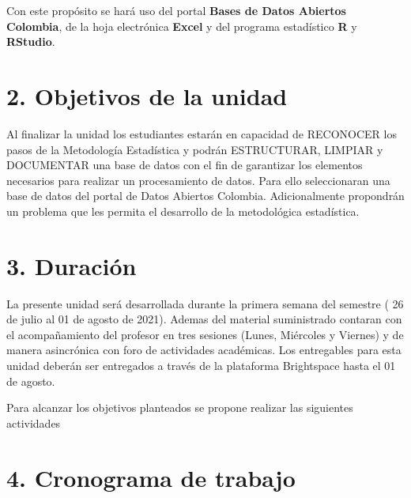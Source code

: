 \documentclass[base=hide,11pt]{elegantbook}
\begin{document}
Con este propósito se hará uso del portal \textbf{Bases de Datos Abiertos Colombia},  de la hoja electrónica \textbf{Excel} y del programa estadístico \textbf{R} y \textbf{RStudio}.\\

\section*{2. Objetivos de la unidad}

Al finalizar la unidad los estudiantes estarán  en  capacidad de  RECONOCER los  pasos de la Metodología Estadística y podrán ESTRUCTURAR, LIMPIAR y DOCUMENTAR una  base de datos con  el fin de  garantizar los elementos  necesarios  para  realizar  un  procesamiento  de  datos. Para ello seleccionaran una base de datos  del  portal de  Datos Abiertos Colombia. Adicionalmente propondrán un problema que les permita el desarrollo de la metodológica estadística. 


\section*{3. Duración}
La presente  unidad será desarrollada durante la  primera semana del semestre ( 26 de julio  al 01  de agosto de 2021). Ademas del material suministrado  contaran con el acompañamiento del profesor en tres sesiones (Lunes, Miércoles y Viernes) y de manera asincrónica con  foro de actividades académicas. Los entregables para esta unidad deberán ser entregados a través de la plataforma Brightspace hasta el  01 de agosto. 

Para alcanzar los objetivos planteados se propone realizar las siguientes actividades
% 	
\section*{4. Cronograma de trabajo}
\end{document}
